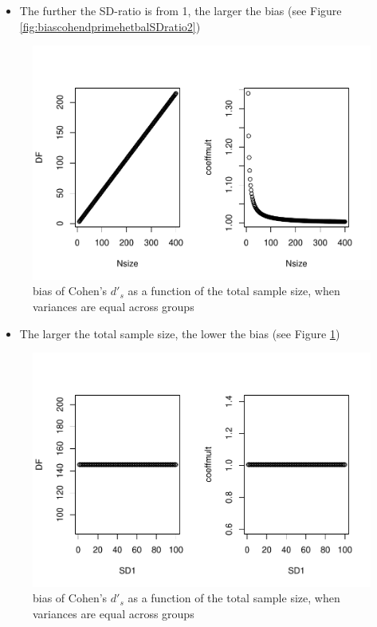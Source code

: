 \documentclass[
  man]{apa6}
\providecommand{\tightlist}{%
  \setlength{\itemsep}{0pt}\setlength{\parskip}{0pt}}
\begin{document}
\begin{itemize}
\tightlist
\item
  The further the SD-ratio is from 1, the larger the bias (see Figure \ref{fig:biascohendprimehetbalSDratio2})
\end{itemize}

\begin{figure}
\centering
\includegraphics{Theoretical-Bias-and-variance,-as-a-function-of-population-parameters_files/figure-latex/biascohendprimehetbalNsize2-1.pdf}
\caption{\label{fig:biascohendprimehetbalNsize2}bias of Cohen's \(d'_s\) as a function of the total sample size, when variances are equal across groups}
\end{figure}

\begin{itemize}
\tightlist
\item
  The larger the total sample size, the lower the bias (see Figure \ref{fig:biascohendprimehetbalNsize2})
\end{itemize}

\begin{figure}
\centering
\includegraphics{Theoretical-Bias-and-variance,-as-a-function-of-population-parameters_files/figure-latex/biascohendprimehetbalvariance2-1.pdf}
\caption{\label{fig:biascohendprimehetbalvariance2}bias of Cohen's \(d'_s\) as a function of the total sample size, when variances are equal across groups}
\end{figure}
\end{document}
